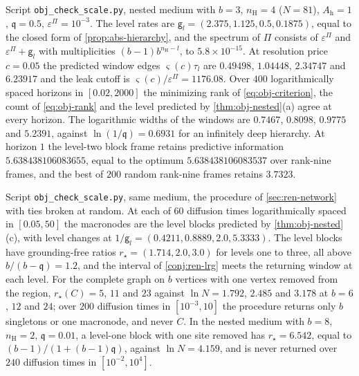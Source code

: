 \begin{numcheck}\label{chk:obj-selection}
Script \texttt{obj\_\allowbreak check\_\allowbreak scale.py}, nested medium with $b=3$, $n_{\mathrm H}=4$ ($N=81$), $A_{\mathrm h}=1$, $\mathfrak q=0.5$, $\varepsilon^\Pi=10^{-3}$. The level rates are $\mathsf g_l=(2.375,1.125,0.5,0.1875)$, equal to the closed form of \cref{prop:abs-hierarchy}, and the spectrum of $\Pi$ consists of $\varepsilon^\Pi$ and $\varepsilon^\Pi+\mathsf g_l$ with multiplicities $(b-1)b^{n_{\mathrm H}-l}$, to $5.8\times10^{-15}$. At resolution price $c=0.05$ the predicted window edges $\varsigma(c)\tau_l$ are $0.49498$, $1.04448$, $2.34747$ and $6.23917$ and the leak cutoff is $\varsigma(c)/\varepsilon^\Pi=1176.08$. Over $400$ logarithmically spaced horizons in $[0.02,2000]$ the minimizing rank of \eqref{eq:obj-criterion}, the count of \eqref{eq:obj-rank} and the level predicted by \cref{thm:obj-nested}(a) agree at every horizon. The logarithmic widths of the windows are $0.7467$, $0.8098$, $0.9775$ and $5.2391$, against $\ln(1/\mathfrak q)=0.6931$ for an infinitely deep hierarchy. At horizon $1$ the level-two block frame retains predictive information $5.638438106083655$, equal to the optimum $5.638438106083537$ over rank-nine frames, and the best of $200$ random rank-nine frames retains $3.7323$.
\end{numcheck}

\begin{numcheck}\label{chk:obj-lrg}
Script \texttt{obj\_\allowbreak check\_\allowbreak scale.py}, same medium, the procedure of \cref{sec:ren-network} with ties broken at random. At each of $60$ diffusion times logarithmically spaced in $[0.05,50]$ the macronodes are the level blocks predicted by \cref{thm:obj-nested}(c), with level changes at $1/\mathsf g_l=(0.4211,0.8889,2.0,5.3333)$. The level blocks have grounding-free ratios $r_\star=(1.714,2.0,3.0)$ for levels one to three, all above $b/(b-\mathfrak q)=1.2$, and the interval of \cref{conj:ren-lrg} meets the returning window at each level. For the complete graph on $b$ vertices with one vertex removed from the region, $r_\star(C)=5$, $11$ and $23$ against $\ln N=1.792$, $2.485$ and $3.178$ at $b=6$, $12$ and $24$; over $200$ diffusion times in $[10^{-3},10]$ the procedure returns only $b$ singletons or one macronode, and never $C$. In the nested medium with $b=8$, $n_{\mathrm H}=2$, $\mathfrak q=0.01$, a level-one block with one site removed has $r_\star=6.542$, equal to $(b-1)/(1+(b-1)\mathfrak q)$, against $\ln N=4.159$, and is never returned over $240$ diffusion times in $[10^{-2},10^4]$.
\end{numcheck}

